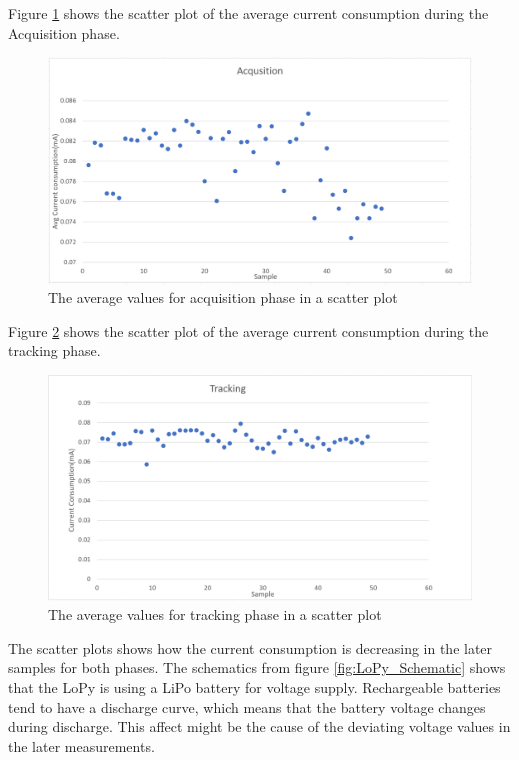 Figure \ref{fig:averageacq} shows the scatter plot of the average current consumption during the Acquisition phase. 
 
\begin{figure}[H]
\centering
\includegraphics[width=15 cm]{Project_Report/Images/AcqusitionData.PNG}
\caption{The average values for acquisition phase in a scatter plot }
\label{fig:averageacq}
\end{figure}

Figure \ref{fig:averagetrack} shows the scatter plot of the average current consumption during the tracking phase.

\begin{figure}[H]
\centering
\includegraphics[width=15 cm]{Project_Report/Images/trackingData.PNG}
\caption{The average values for tracking phase in a scatter plot }
\label{fig:averagetrack}
\end{figure}
 
The scatter plots shows how the current consumption is decreasing in the later samples for both phases. The schematics from figure \ref{fig:LoPy_Schematic} shows that the LoPy is using a LiPo battery for voltage supply. Rechargeable batteries  tend to have a discharge curve, which means that the battery voltage changes during discharge. This affect might be the cause of the deviating voltage values in the later measurements. 

